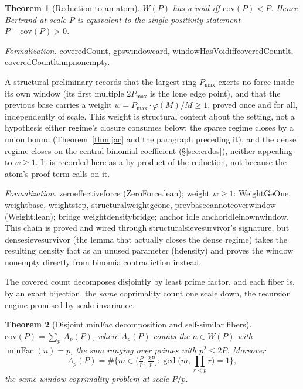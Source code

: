 \documentclass[11pt,a4paper]{amsart}
\theoremstyle{plain}
\newtheorem{theorem}{Theorem}[section]
\theoremstyle{definition}
\theoremstyle{plain}
\theoremstyle{remark}
\newcommand{\lean}[1]{\begingroup\upshape\ttfamily\def\_{\textunderscore\allowbreak}#1\endgroup}
\newcommand{\Formal}[1]{\par\smallskip\noindent\begingroup\raggedright\emph{Formalization.} #1\par\endgroup\smallskip}
\begin{document}
\begin{theorem}[Reduction to an atom]\label{thm:atom}
$W(P)$ has a void iff $\mathrm{cov}(P)<P$. Hence Bertrand at scale $P$ is equivalent to the
single positivity statement $P-\mathrm{cov}(P)>0$.
\end{theorem}

\Formal{\lean{coveredCount}, \lean{gps\_window\_card},
\lean{windowHasVoid\_iff\_coveredCount\_lt}, \lean{coveredCount\_lt\_imp\_nonempty}.}

A structural preliminary records that the largest ring $P_{\max}$ exerts no force inside
its own window (its first multiple $2P_{\max}$ is the lone edge point), and that the
previous base carries a weight $w=P_{\max}\cdot\varphi(M)/M\ge1$, proved once and for all,
independently of scale. This weight is structural content about the setting, not a
hypothesis either regime's closure consumes below: the sparse regime closes by a union
bound (Theorem~\ref{thm:jac} and the paragraph preceding it), and the dense regime closes
on the central binomial coefficient (\S\ref{sec:erdos}), neither appealing to $w\ge1$. It is
recorded here as a by-product of the reduction, not because the atom's proof term calls on
it.

\Formal{\lean{zero\_effective\_force} (\lean{ZeroForce.lean}); weight
$w\ge1$: \lean{WeightGeOne}, \lean{weight\_base}, \lean{weight\_step},
\lean{structural\_weight\_ge\_one}, \lean{prev\_base\_cannot\_cover\_window}
(\lean{Weight.lean}); bridge \lean{weight\_density\_bridge}; anchor idle
\lean{anchor\_idle\_in\_own\_window}. This chain is proved and wired through
\lean{structural\_sieve\_survivor}'s signature, but \lean{dense\_sieve\_survivor} (the
lemma that actually closes the dense regime) takes the resulting density fact as an
unused parameter (\lean{\_hdensity}) and proves the window nonempty directly from
\lean{binomial\_contradiction} instead.}

The covered count decomposes disjointly by least prime factor, and each fiber is, by an
exact bijection, the \emph{same} coprimality count one scale down, the recursion engine
promised by scale invariance.

\begin{theorem}[Disjoint minFac decomposition and self-similar fibers]\label{thm:fiber}
$\displaystyle \mathrm{cov}(P)=\sum_{p}\, A_p(P)$, where $A_p(P)$ counts the $n\in W(P)$
with $\operatorname{minFac}(n)=p$, the sum ranging over primes with $p^2\le 2P$. Moreover
\[
A_p(P)=\#\Big\{m\in\big(\tfrac{P}{p},\tfrac{2P}{p}\big]:
\gcd\big(m,\textstyle\prod_{r<p}r\big)=1\Big\},
\]
the same window-coprimality problem at scale $P/p$.
\end{theorem}
\end{document}

